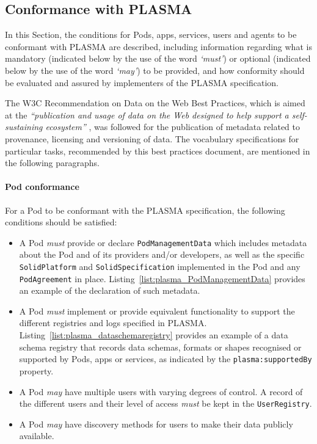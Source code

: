 \subsection{Conformance with PLASMA}
\label{sec:plasma_conformance}

In this Section, the conditions for Pods, apps, services, users and agents to be conformant with PLASMA are described, including information regarding what is mandatory (indicated below by the use of the word \textit{`must'}) or optional (indicated below by the use of the word \textit{`may'}) to be provided, and how conformity should be evaluated and assured by implementers of the PLASMA specification.

The W3C Recommendation on Data on the Web Best Practices, which is aimed at the \textit{``publication and usage of data on the Web designed to help support a self-sustaining ecosystem''} \citep{loscio_data_2017}, was followed for the publication of metadata related to provenance, licensing and versioning of data.
The vocabulary specifications for particular tasks, recommended by this best practices document, are mentioned in the following paragraphs.

\paragraph{Pod conformance}
For a Pod to be conformant with the PLASMA specification, the following conditions should be satisfied:

\begin{itemize}
    \item A Pod \textit{must} provide or declare \texttt{PodManagementData} which includes metadata about the Pod and of its providers and/or developers, as well as the specific \texttt{SolidPlatform} and \texttt{SolidSpecification} implemented in the Pod and any \texttt{PodAgreement} in place. Listing~\ref{list:plasma_PodManagementData} provides an example of the declaration of such metadata.
    \item A Pod \textit{must} implement or provide equivalent functionality to support the different registries and logs specified in PLASMA. Listing~\ref{list:plasma_dataschemaregistry} provides an example of a data schema registry that records data schemas, formats or shapes recognised or supported by Pods, apps or services, as indicated by the \texttt{plasma:supportedBy} property.
    \item A Pod \textit{may} have multiple users with varying degrees of control. A record of the different users and their level of access \textit{must} be kept in the \texttt{UserRegistry}.
    \item A Pod \textit{may} have discovery methods for users to make their data publicly available.
\end{itemize}

